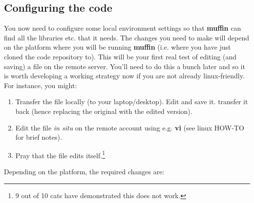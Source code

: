 \documentclass[11pt,fleqn]{book} %
\begin{document}
\subsection{Configuring the code}

\noindent You now need to configure some local environment settings so that \textbf{muffin} can find all the libraries etc. that it needs. The changes you need to make will depend on the platform where you will be running \textbf{muffin} (i.e. where you have just cloned the code repository to). This will be your first real test of editing (and saving) a file on the remote server. You'll need to do this a bunch later and so it is worth developing a working strategy now if you are not already linux-friendly. For instance, you might:

\begin{enumerate}[noitemsep]
\vspace{1mm}
\item Transfer the file locally (to your laptop/desktop). Edit and save it. transfer it back (hence replacing the original with the edited version).
\vspace{1mm}
\item Edit the file \textit{in situ} on the remote account using e.g. \textbf{vi} (see linux HOW-TO for brief notes).
\vspace{1mm}
\item Pray that the file edits itself.\footnote{9 out of 10 cats have demonstrated this does not work.}
\end{enumerate}

\vspace{1mm}
\noindent Depending on the platform, the required changes are:
\end{document}
